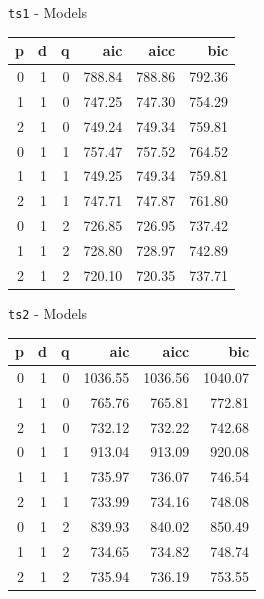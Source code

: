\documentclass[11pt,ignorenonframetext,]{beamer}
\begin{document}
\begin{frame}{%
\protect\hypertarget{ts1---models}{%
\texttt{ts1} - Models}}

\begin{longtable}[]{@{}rrrrrr@{}}
\toprule
p & d & q & aic & aicc & bic\tabularnewline
\midrule
\endhead
0 & 1 & 0 & 788.84 & 788.86 & 792.36\tabularnewline
1 & 1 & 0 & 747.25 & 747.30 & 754.29\tabularnewline
2 & 1 & 0 & 749.24 & 749.34 & 759.81\tabularnewline
0 & 1 & 1 & 757.47 & 757.52 & 764.52\tabularnewline
1 & 1 & 1 & 749.25 & 749.34 & 759.81\tabularnewline
2 & 1 & 1 & 747.71 & 747.87 & 761.80\tabularnewline
0 & 1 & 2 & 726.85 & 726.95 & 737.42\tabularnewline
1 & 1 & 2 & 728.80 & 728.97 & 742.89\tabularnewline
2 & 1 & 2 & 720.10 & 720.35 & 737.71\tabularnewline
\bottomrule
\end{longtable}

\end{frame}

\begin{frame}{%
\protect\hypertarget{ts2---models}{%
\texttt{ts2} - Models}}

\begin{longtable}[]{@{}rrrrrr@{}}
\toprule
p & d & q & aic & aicc & bic\tabularnewline
\midrule
\endhead
0 & 1 & 0 & 1036.55 & 1036.56 & 1040.07\tabularnewline
1 & 1 & 0 & 765.76 & 765.81 & 772.81\tabularnewline
2 & 1 & 0 & 732.12 & 732.22 & 742.68\tabularnewline
0 & 1 & 1 & 913.04 & 913.09 & 920.08\tabularnewline
1 & 1 & 1 & 735.97 & 736.07 & 746.54\tabularnewline
2 & 1 & 1 & 733.99 & 734.16 & 748.08\tabularnewline
0 & 1 & 2 & 839.93 & 840.02 & 850.49\tabularnewline
1 & 1 & 2 & 734.65 & 734.82 & 748.74\tabularnewline
2 & 1 & 2 & 735.94 & 736.19 & 753.55\tabularnewline
\bottomrule
\end{longtable}

\end{frame}
\end{document}
